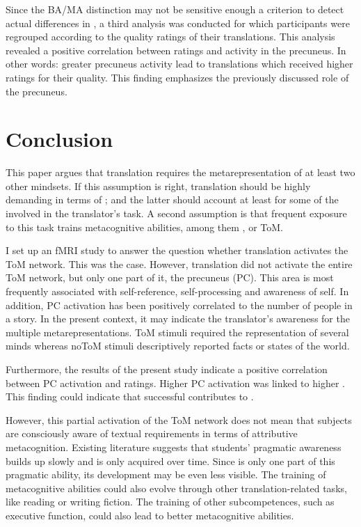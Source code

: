 \documentclass[output=paper]{LSP/langsci}
\begin{document}
Since the BA/MA distinction may not be sensitive enough a criterion to detect actual differences in , a third analysis was conducted for which participants were regrouped according to the quality ratings of their translations. This analysis revealed a positive correlation between  ratings and activity in the precuneus. In other words: greater precuneus activity lead to translations which received higher ratings for their quality. This finding emphasizes the previously discussed role of the precuneus. 

\section{Conclusion}
\largerpage
This paper argues that translation requires the metarepresentation of at least two other mindsets. If this assumption is right, translation should be highly demanding in terms of ; and the latter should account at least for some of the  involved in the translator's task. A second assumption is that frequent exposure to this task trains metacognitive abilities, among them , or ToM. 

I set up an fMRI study to answer the question whether translation activates the ToM network. This was the case. However, translation did not activate the entire ToM network, but only one part of it, the precuneus (PC). This area is most frequently associated with self-reference, self-processing and awareness of self. In addition, PC activation has been positively correlated to the number of people in a story. In the present context, it may indicate the translator's awareness for the multiple metarepresentations. ToM stimuli required the representation of several minds whereas noToM stimuli descriptively reported facts or states of the world. 

Furthermore, the results of the present study indicate a positive correlation between PC activation and  ratings. Higher PC activation was linked to higher . This finding could indicate that successful  contributes to . 

However, this partial activation of the ToM network does not mean that subjects are consciously aware of textual requirements in terms of attributive meta\-cognition. Existing literature suggests that students' pragmatic awareness builds up slowly and is only acquired over time. Since  is only one part of this pragmatic ability, its development may be even less visible. The training of metacognitive abilities could also evolve through other translation-related tasks, like reading or writing fiction. The training of other subcompetences, such as executive function, could also lead to better metacognitive abilities. 
\end{document}
